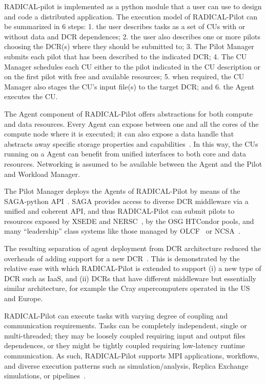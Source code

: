 \documentclass{sig-alternate}
\begin{document}
RADICAL-pilot is implemented as a python module that a user can use to design
and code a distributed application. The execution model of RADICAL-Pilot can be
summarized in 6 steps: 1. the user describes tasks as a set of CUs with or
without data and DCR dependences; 2. the user also describes one or more pilots
choosing the DCR(s) where they should be submitted to; 3. The Pilot Manager
submits each pilot that has been described to the indicated DCR; 4. The CU
Manager schedules each CU either to the pilot indicated in the CU description or
on the first pilot with free and available resources; 5. when required, the CU
Manager also stages the CU's input file(s) to the target DCR; and 6. the Agent
executes the CU.

The Agent component of RADICAL-Pilot offers abstractions for both compute and
data resources. Every Agent can expose between one and all the cores of the
compute node where it is executed; it can also expose a data handle that
abstracts away specific storage properties and capabilities~\cite{luckow2010}.
In this way, the CUs running on a Agent can benefit from unified interfaces to
both core and data resources. Networking is assumed to be available between the
Agent and the Pilot and Workload Manager.

The Pilot Manager deploys the Agents of RADICAL-Pilot by means of the
SAGA-python API~\cite{merzky2015saga}. SAGA provides access to diverse DCR
middleware via a unified and coherent API, and thus RADICAL-Pilot can submit
pilots to resources exposed by XSEDE and NERSC~\cite{nersc_url}, by the OSG
HTCondor pools, and many ``leadership'' class systems like those managed by
OLCF~\cite{olcf_url} or NCSA~\cite{ncsa_url}.

The resulting separation of agent deployment from DCR architecture reduced the
overheads of adding support for a new DCR~\cite{merzky2015radical}. This is
demonstrated by the relative ease with which RADICAL-Pilot is extended to
support (i) a new type of DCR such as IaaS, and (ii) DCRs that have different
middleware but essentially similar architecture, for example the Cray
supercomputers operated in the US and Europe.

RADICAL-Pilot can execute tasks with varying degree of coupling and
communication requirements. Tasks can be completely independent, single or
multi-threaded; they may be loosely coupled requiring input and output files
dependences, or they might be tightly coupled requiring low-latency runtime
communication. As such, RADICAL-Pilot supports MPI applications, workflows, and
diverse execution patterns such as simulation/analysis, Replica Exchange
simulations, or pipelines~\cite{emdtoolkit_url}.
\end{document}
